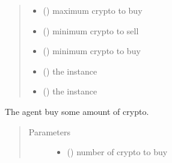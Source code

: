 \documentclass[letterpaper,10pt,english]{sphinxmanual}
\begin{document}
\begin{fulllineitems}
\begin{fulllineitems}
\begin{quote}
\begin{description}
\begin{itemize}
\item {} 
\sphinxAtStartPar
{} () \textendash{} maximum crypto to buy

\item {} 
\sphinxAtStartPar
{} () \textendash{} minimum crypto to sell

\item {} 
\sphinxAtStartPar
{} () \textendash{} minimum crypto to buy

\item {} 
\sphinxAtStartPar
{} () \textendash{} the {\hyperref[\detokenize{DataLoader:crypto_env.dataloader.DataLoader}]{}} instance

\item {} 
\sphinxAtStartPar
{} () \textendash{} the  instance

\end{itemize}

\end{description}\end{quote}

\end{fulllineitems}


\begin{fulllineitems}
\label{\detokenize{CryptoEnv:crypto_env.core.CryptoEnv.buy}}
\sphinxAtStartPar
The agent buy some amount of crypto.
\begin{quote}\begin{description}
\item[{Parameters}] \leavevmode\begin{itemize}
\item {} 
\sphinxAtStartPar
{} () \textendash{} number of crypto to buy


\end{itemize}
\end{description}
\end{quote}
\end{fulllineitems}
\end{fulllineitems}
\end{document}
